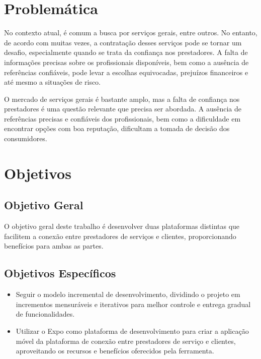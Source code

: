 \section{Problemática}

No contexto atual, é comum a busca por serviços gerais, entre outros. No entanto, de acordo com \textcite{FEUP2009} muitas vezes, a contratação desses serviços pode se tornar um desafio, especialmente quando se trata da confiança nos prestadores. A falta de informações precisas sobre os profissionais disponíveis, bem como a ausência de referências confiáveis, pode levar a escolhas equivocadas, prejuízos financeiros e até mesmo a situações de risco.

O mercado de serviços gerais é bastante amplo, mas a falta de confiança nos prestadores é uma questão relevante que precisa ser abordada. A ausência de referências precisas e confiáveis dos profissionais, bem como a dificuldade em encontrar opções com boa reputação, dificultam a tomada de decisão dos consumidores.

\section{Objetivos}



\subsection{Objetivo Geral}
O objetivo geral deste trabalho é desenvolver duas plataformas distintas que facilitem a conexão entre prestadores de serviços e clientes, proporcionando benefícios para ambas as partes.
\subsection{Objetivos Específicos}
\begin{itemize}
    \item Seguir o modelo incremental de desenvolvimento, dividindo o projeto em incrementos mensuráveis e iterativos para melhor controle e entrega gradual de funcionalidades.
    \item Utilizar o Expo como plataforma de desenvolvimento para criar a aplicação móvel da plataforma de conexão entre prestadores de serviço e clientes, aproveitando os recursos e benefícios oferecidos pela ferramenta.
  \end{itemize}
